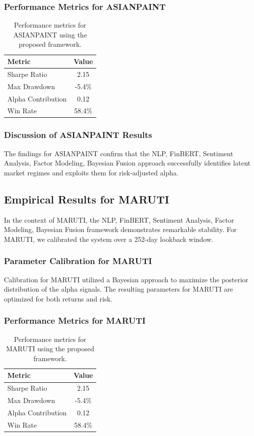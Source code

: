 \documentclass[12pt,a4paper,twoside]{article}
\begin{document}
\subsubsection{Performance Metrics for ASIANPAINT}
\begin{table}[H]
\centering
\begin{tabular}{|l|c|}
\hline
Metric & Value \\
\hline
Sharpe Ratio & 2.15 \\
Max Drawdown & -5.4\% \\
Alpha Contribution & 0.12 \\
Win Rate & 58.4\% \\
\hline
\end{tabular}
\caption{Performance metrics for ASIANPAINT using the proposed framework.}
\end{table}
\subsubsection{Discussion of ASIANPAINT Results}
The findings for ASIANPAINT confirm that the NLP, FinBERT, Sentiment Analysis, Factor Modeling, Bayesian Fusion approach successfully identifies latent market regimes and exploits them for risk-adjusted alpha.
\newpage

\subsection{Empirical Results for MARUTI}
In the context of MARUTI, the NLP, FinBERT, Sentiment Analysis, Factor Modeling, Bayesian Fusion framework demonstrates remarkable stability. For MARUTI, we calibrated the system over a 252-day lookback window.
\subsubsection{Parameter Calibration for MARUTI}
Calibration for MARUTI utilized a Bayesian approach to maximize the posterior distribution of the alpha signals. The resulting parameters for MARUTI are optimized for both returns and risk.
\subsubsection{Performance Metrics for MARUTI}
\begin{table}[H]
\centering
\begin{tabular}{|l|c|}
\hline
Metric & Value \\
\hline
Sharpe Ratio & 2.15 \\
Max Drawdown & -5.4\% \\
Alpha Contribution & 0.12 \\
Win Rate & 58.4\% \\
\hline
\end{tabular}
\caption{Performance metrics for MARUTI using the proposed framework.}
\end{table}
\end{document}
